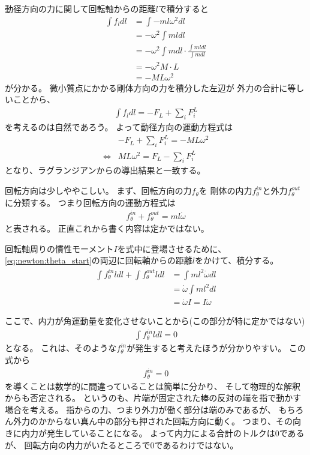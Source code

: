\documentclass[a4paper,11pt]{jsarticle}
\begin{document}
動径方向の力に関して回転軸からの距離$l$で積分すると
\begin{align}
  \int f_l dl 
  &= \int -ml\omega^2 dl
  \\
  &= -\omega^2 \int ml dl
  \\
  &= -\omega^2 \int m dl \cdot \frac{ \int ml dl }{\int m dl }
  \\
  &= -\omega^2 M \cdot L
  \\
  &= -ML\omega^2
\end{align}
が分かる。
微小質点にかかる剛体方向の力を積分した左辺が
外力の合計に等しいことから、
\begin{align}
  \int f_l dl = -F_L + \sum_i F_i^{L}
\end{align}
を考えるのは自然であろう。
よって動径方向の運動方程式は
\begin{align}
  & -F_L + \sum_i F_i^{L} = -ML\omega^2
  \\
  \Leftrightarrow
  & ML\omega^2 = F_L - \sum_i F_i^{L}
  \label{eq:newton:length_end}
\end{align}
となり、ラグランジアンからの導出結果と一致する。

回転方向は少しややこしい。
まず、回転方向の力$f_\theta$を
剛体の内力$f_\theta^{in}$と外力$f_\theta^{out}$に分類する。
つまり回転方向の運動方程式は
\begin{align}
  f_\theta^{in} + f_\theta^{out} = ml\dot\omega
  \label{eq:newton:theta_start}
\end{align}
と表される。
正直これから書く内容は定かではない。

回転軸周りの慣性モーメント$I$を式中に登場させるために、
\ref{eq:newton:theta_start}の両辺に回転軸からの距離$l$をかけて、積分する。
\begin{align}
  \int f_\theta^{in} l dl + \int f_\theta^{out} l dl
  &= \int ml^2\dot\omega dl
  \\
  &= \dot\omega\int ml^2 dl
  \\
  &= \dot\omega I = I\dot\omega
\end{align}

ここで、内力が角運動量を変化させないことから(この部分が特に定かではない)
\begin{align}
  \int f_\theta^{in} l dl = 0
\end{align}
となる。
これは、そのような$f_\theta^{in}$が発生すると考えたほうが分かりやすい。
この式から
\begin{align}
  f_\theta^{in} = 0
\end{align}
を導くことは数学的に間違っていることは簡単に分かり、
そして物理的な解釈からも否定される。
というのも、片端が固定された棒の反対の端を指で動かす場合を考える。
指からの力、つまり外力が働く部分は端のみであるが、
もちろん外力のかからない真ん中の部分も押された回転方向に動く。
つまり、その向きに内力が発生していることになる。
よって内力による合計のトルクは0であるが、
回転方向の内力がいたるところで0であるわけではない。
\end{document}
